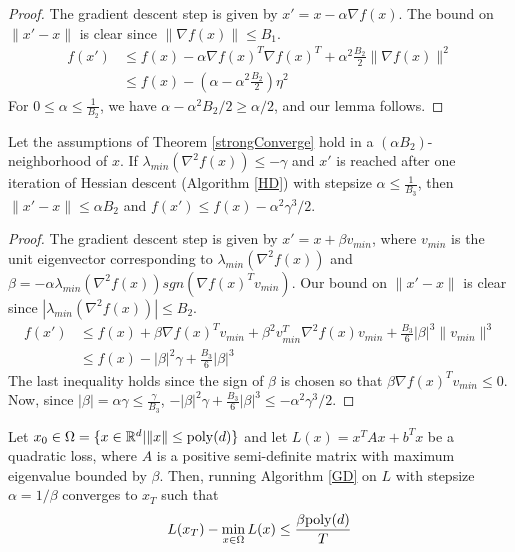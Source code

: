 \begin{proof}
The gradient descent step is given by $x' = x - \alpha \nabla f(x)$. The bound on $\|x' - x\|$ is clear since $\|\nabla f(x) \| \leq B_1$.
\begin{align*}
f(x') &\leq f(x) - \alpha \nabla f(x)^T\nabla f(x)^T + \alpha^2\frac{B_2}{2} \|\nabla f(x)\|^2 \\
&\leq f(x) - (\alpha - \alpha^2 \frac{B_2}{2}) \eta^2 
\end{align*}
For $0 \leq \alpha \leq \frac{1}{B_2}$, we have $\alpha - \alpha^2B_2/2 \geq \alpha/2$, and our lemma follows.
\end{proof}

\begin{lemma}\label{HessianDecrease}
Let the assumptions of Theorem \ref{strongConverge} hold in a $(\alpha B_2)$-neighborhood of $x$. If $\lambda_{min}(\nabla^2 f (x)) \leq -\gamma$ and $x'$ is reached after one iteration of Hessian descent (Algorithm \ref{HD}) with stepsize $\alpha \leq \frac{1}{B_3}$, then $\|x' - x\| \leq \alpha B_2$ and $f(x') \leq f(x) - \alpha^2 \gamma^3/2$.
\end{lemma}

\begin{proof}
The gradient descent step is given by $x' = x + \beta v_{min}$, where $v_{min}$ is the unit eigenvector corresponding to $\lambda_{min}(\nabla^2f(x))$ and $\beta = -\alpha\lambda_{min}(\nabla^2 f(x))sgn(\nabla f(x)^Tv_{min})$. Our bound on $\|x' - x\|$ is clear since $|\lambda_{min}(\nabla^2 f(x))| \leq B_2$.
\begin{align*}
f(x') &\leq f(x) + \beta\nabla f(x)^Tv_{min} + \beta^2 v_{min}^T\nabla^2f(x)v_{min} + \frac{B_3}{6} |\beta|^3 \|v_{min}\|^3 \\
&\leq f(x) - |\beta|^2 \gamma + \frac{B_3}{6} |\beta|^3
\end{align*}
The last inequality holds since the sign of $\beta$ is chosen so that $\beta \nabla f(x)^Tv_{min} \leq 0$. Now, since $|\beta| = \alpha \gamma \leq \frac{\gamma}{B_3}$, $-|\beta|^2\gamma + \frac{B_3}{6} |\beta|^3 \leq - \alpha^2 \gamma^3/2$. 
\end{proof}

%
\begin{theorem}\cite{nesterov2013introductory}\label{quadConverge}
  Let $x_0 \in \Omega = \{ x \in {\mathbb{R}}^d | \|x \| \leq \mathrm{poly}(d)\}$ and let
  $L(x) = x^TAx + b^Tx$ be a quadratic loss, where $A$ is a positive
  semi-definite matrix with maximum eigenvalue bounded by $\beta$. Then, running
  Algorithm \ref{GD} on $L$ with stepsize $\alpha = 1/\beta$ converges
  to $x_T$ such that
  \[L(x_T) - \min_{x \in \Omega} L(x) \leq \frac{\beta \mathrm{poly}(d)}{T}\]
\end{theorem} 


